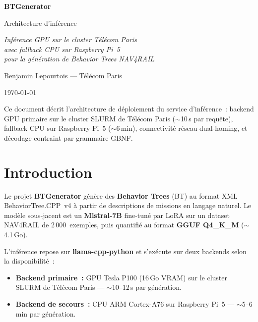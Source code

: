 \documentclass[a4paper,11pt]{article}
\begin{document}
\begin{titlepage}
\centering
\vspace*{3cm}
{\Huge\bfseries BTGenerator\par}
\vspace{0.5cm}
{\LARGE Architecture d'inférence\par}
\vspace{1.5cm}
{\large\itshape Inférence GPU sur le cluster Télécom Paris\\
avec fallback CPU sur Raspberry Pi~5\\
pour la génération de Behavior Trees NAV4RAIL\par}
\vspace{2cm}
{\large Benjamin Lepourtois --- Télécom Paris\par}
\vspace{1cm}
{\large\today\par}
\vfill
{\small Ce document décrit l'architecture de déploiement du service
d'inférence~: backend GPU primaire sur le cluster SLURM de
Télécom Paris ($\sim$10\,s par requête), fallback CPU sur Raspberry Pi~5
($\sim$6\,min), connectivité réseau dual-homing, et décodage contraint
par grammaire GBNF.}
\end{titlepage}

\tableofcontents
\newpage

\section{Introduction}

Le projet \textbf{BTGenerator} génère des \textbf{Behavior Trees} (BT) au
format XML BehaviorTree.CPP~v4 à partir de descriptions de missions en
langage naturel. Le modèle sous-jacent est un \textbf{Mistral-7B} fine-tuné
par LoRA sur un dataset NAV4RAIL de 2\,000~exemples, puis quantifié au
format \textbf{GGUF Q4\_K\_M} ($\sim$4.1\,Go).

L'inférence repose sur \textbf{llama-cpp-python} et s'exécute sur deux
backends selon la disponibilité~:

\begin{itemize}
    \item \textbf{Backend primaire~:} GPU Tesla P100 (16\,Go VRAM) sur le
    cluster SLURM de Télécom Paris --- $\sim$10--12\,s par génération.
    \item \textbf{Backend de secours~:} CPU ARM Cortex-A76 sur Raspberry
    Pi~5 --- $\sim$5--6\,min par génération.
\end{itemize}
\end{document}
